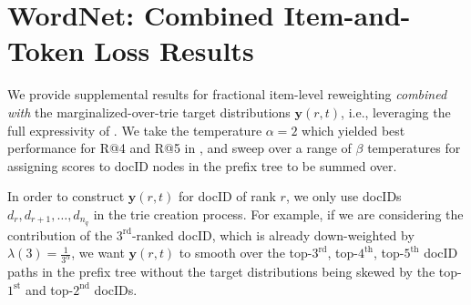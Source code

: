 \documentclass[11pt, a4paper, onecolumn, confidential, copyright, gdm]{google}
\begin{document}
\newpage
\section{WordNet: Combined Item-and-Token Loss Results}

We provide supplemental results for fractional item-level reweighting \textit{combined with} the marginalized-over-trie target distributions $\mathbf{y}(r,t)$, i.e., leveraging the full expressivity of . We take the temperature $\alpha=2$ which yielded best performance for R@4 and R@5 in , and sweep over a range of $\beta$ temperatures for assigning scores to docID nodes in the prefix tree to be summed over.

In order to construct $\mathbf{y}(r,t)$ for docID of rank $r$, we only use docIDs $d_r, d_{r+1}, \ldots, d_{n_q}$ in the trie creation process. For example, if we are considering the contribution of the $3^\text{rd}$-ranked docID, which is already down-weighted by $\lambda(3)=\frac{1}{3^\alpha}$, we want $\mathbf{y}(r,t)$ to smooth over the top-$3^\text{rd}$, top-$4^\text{th}$, top-$5^\text{th}$ docID paths in the prefix tree without the target distributions being skewed by the top-$1^\text{st}$ and top-$2^\text{nd}$ docIDs.

\begin{table}[htbp]
\small
\centering
{}
\caption{WordNet results for combined item-and-token loss (evaluated over 5000 (query, targets)-examples)}
\label{tab:wordnet-combined-loss-from-checkpoint}
\end{table}
\end{document}
